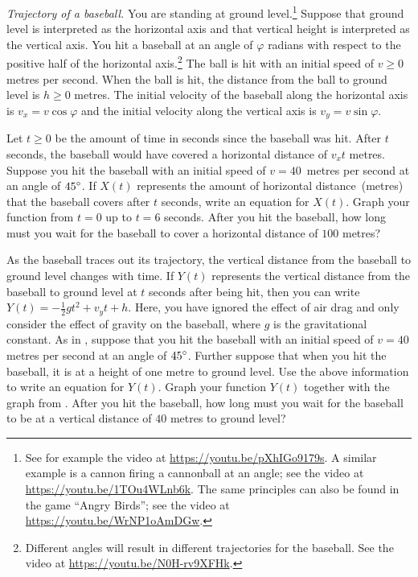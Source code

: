 \documentclass[a4paper,oneside,12pt]{article}
\begin{document}
\begin{problem}
\item\emph{Trajectory of a baseball.}
  You are standing at ground level.\footnote{
    See for example the video at
    \url{https://youtu.be/pXhIGo9179s}.
    A similar example is a cannon firing a cannonball at an angle; see
    the video at
    \url{https://youtu.be/1TOu4WLnb6k}.
    The same principles can also be found in the game
    ``Angry Birds''; see the video at
    \url{https://youtu.be/WrNP1oAmDGw}.
  }
  Suppose that ground level is interpreted as the horizontal axis and
  that vertical height is interpreted as the vertical axis.  You hit a
  baseball at an angle of $\varphi$ radians with respect to the
  positive half of the horizontal axis.\footnote{
    Different angles will result in different trajectories for the
    baseball.  See the video at
    \url{https://youtu.be/N0H-rv9XFHk}.
  }
  The ball is hit with an initial speed of $v \geq 0$ metres per
  second.  When the ball is hit, the distance from the ball to ground
  level is $h \geq 0$ metres.  The initial velocity of the baseball
  along the horizontal axis is $v_x = v \cos\varphi$ and the initial
  velocity along the vertical axis is $v_y = v \sin\varphi$.
  \begin{packedenum}
  \item\label{subprob:trigonometric:baseball_X(t)}
    Let $t \geq 0$ be the amount of time in seconds since the baseball
    was hit.  After $t$ seconds, the baseball would have covered a
    horizontal distance of $v_x t$ metres.  Suppose you hit the
    baseball with an initial speed of $v = 40$~metres per second at an
    angle of ${45}^{\circ}$.  If $X(t)$ represents the amount of
    horizontal distance~(metres) that the baseball covers after $t$
    seconds, write an equation for $X(t)$.  Graph your function from
    $t = 0$ up to $t = 6$ seconds.  After you hit the baseball, how
    long must you wait for the baseball to cover a horizontal distance
    of $100$ metres?

  \item\label{subprob:trigonometric:baseball_Y(t)}
    As the baseball traces out its trajectory, the vertical distance
    from the baseball to ground level changes with time.  If $Y(t)$
    represents the vertical distance from the baseball to ground level
    at $t$ seconds after being hit, then you can write
    $Y(t) = -\frac{1}{2} g t^2 + v_y t + h$.  Here, you have ignored
    the effect of air drag and only consider the effect of gravity on
    the baseball, where $g$ is the gravitational constant.  As
    in , suppose that you
    hit the baseball with an initial speed of $v = 40$ metres per
    second at an angle of ${45}^{\circ}$.  Further suppose that when
    you hit the baseball, it is at a height of one metre to ground
    level.  Use the above information to write an equation for
    $Y(t)$.  Graph your function $Y(t)$ together with the graph
    from .  After you hit
    the baseball, how long must you wait for the baseball to be at a
    vertical distance of $40$ metres to ground level?


\end{packedenum}
\end{problem}
\end{document}
